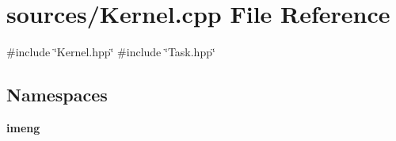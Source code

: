 \section{sources/\+Kernel.cpp File Reference}
\label{_kernel_8cpp}
{\ttfamily \#include \char`\"{}Kernel.\+hpp\char`\"{}}\newline
{\ttfamily \#include \char`\"{}Task.\+hpp\char`\"{}}\newline
\subsection*{Namespaces}
\begin{DoxyCompactItemize}
\item 
 \textbf{ imeng}
\end{DoxyCompactItemize}

